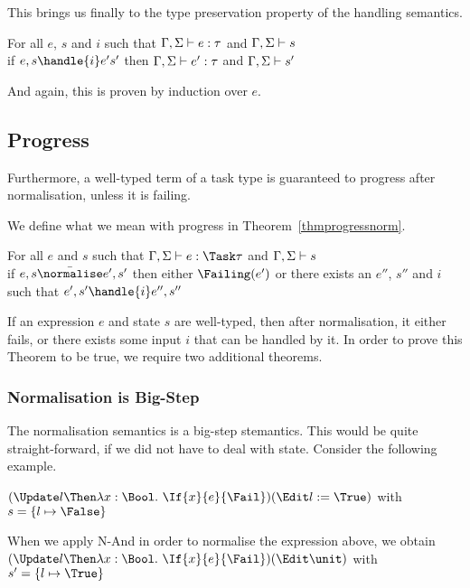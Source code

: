 This brings us finally to the type preservation property of the handling semantics.

\begin{theorem}
  For all $e$, $s$ and $i$ such that $\Gamma,\Sigma\vdash e:\tau$ and $\Gamma,\Sigma\vdash s$\\
  if $ e,s \handle{i} e's'$ then $\Gamma,\Sigma\vdash e':\tau$ and $\Gamma,\Sigma\vdash s'$
   \label{thmpreshandle}
\end{theorem}

And again, this is proven by induction over $e$.

\subsection{Progress}

Furthermore, a well-typed term of a task type is guaranteed to progress after
normalisation, unless it is failing.

We define what we mean with progress in Theorem~\ref{thmprogressnorm}.

\begin{theorem}
  For all $e$ and $s$ such that $\Gamma,\Sigma\infers e:\Task\tau$ and $\Gamma,\Sigma\vdash s$\\
  if $e,s \bar{\normalise} e',s'$ then either $\Failing(e')$ or there exists an $e''$, $s''$ and $i$ such that $e',s'\handle{i}e'',s''$
  \label{thmprogressnorm}
\end{theorem}

If an expression $e$ and state $s$ are well-typed, then after normalisation, it
either fails, or there exists some input $i$ that can be handled by it.
In order to prove this Theorem to be true, we require two additional theorems.

\subsubsection{Normalisation is Big-Step}

The normalisation semantics is a big-step stemantics. This would be quite
straight-forward, if we did not have to deal with state. Consider the following
example.

$(\Update l \Then \lambda x:\Bool .\ \If{x}{e}{\Fail})\And (\Edit l:=\True)$ with $s=\{l\mapsto \False\}$

When we apply N-And in order to normalise the expression above, we obtain
$(\Update l \Then \lambda x:\Bool .\ \If{x}{e}{\Fail})\And (\Edit \unit)$ with $s'=\{l\mapsto \True\}$

